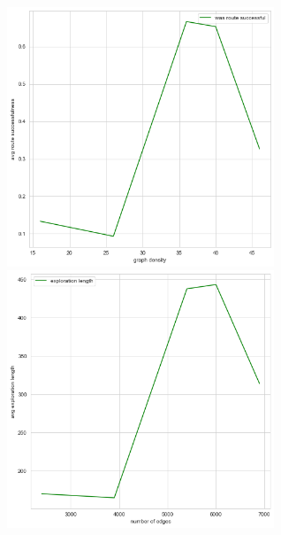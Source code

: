\documentclass{article}
\begin{document}
\begin{figure}
  \centering
  \includegraphics[width=8cm]{figures/reg_uj/edge_den_succ.png}
  \hspace{1cm}
  \includegraphics[width=8cm]{figures/reg_uj/edge_expl.png}
  \vspace{1cm}


\end{figure}
\end{document}
